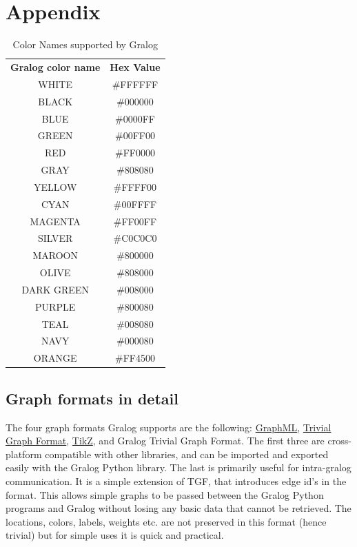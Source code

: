 \documentclass{article}
\newlength\q
\begin{document}
\section{Appendix}


\begin{table}[h!]
  \begin{center}
    \caption{Color Names supported by Gralog}
    \label{colorNamesSupportedByGralog}
    \begin{tabular}{c|c} %
      \textbf{Gralog color name} & \textbf{Hex Value}\\
      WHITE   &\#FFFFFF\\
\hline
BLACK   &\#000000\\
\hline
BLUE    &\#0000FF\\
\hline
GREEN   &\#00FF00\\
\hline
RED     &\#FF0000\\
\hline
GRAY    &\#808080\\
\hline
YELLOW  &\#FFFF00\\
\hline
CYAN    &\#00FFFF\\
\hline
MAGENTA &\#FF00FF\\
\hline
SILVER  &\#C0C0C0\\
\hline
MAROON  &\#800000\\
\hline
OLIVE &\#808000\\
\hline
DARK GREEN &\#008000\\
\hline
PURPLE  &\#800080\\
\hline
TEAL  &\#008080\\
\hline
NAVY    &\#000080\\
\hline
ORANGE  &\#FF4500
    \end{tabular}
  \end{center}
\end{table}

\subsection{Graph formats in detail}
\label{graphFormatsInDetail}
The four graph formats Gralog supports are the following: \href{https://en.wikipedia.org/wiki/GraphML}{GraphML}, \href{https://en.wikipedia.org/wiki/Trivial\_Graph\_Format}{Trivial Graph Format}, \href{https://en.wikipedia.org/wiki/PGF/TikZ}{TikZ}, and Gralog Trivial Graph Format. The first three are cross-platform compatible with other libraries, and can be imported and exported easily with the Gralog Python library. The last is primarily useful for intra-gralog communication. It is a simple extension of TGF, that introduces edge id's in the format. This allows simple graphs to be passed between the Gralog Python programs and Gralog without losing any basic data that cannot be retrieved. The locations, colors, labels, weights etc. are not preserved in this format (hence trivial) but for simple uses it is quick and practical.
\end{document}
